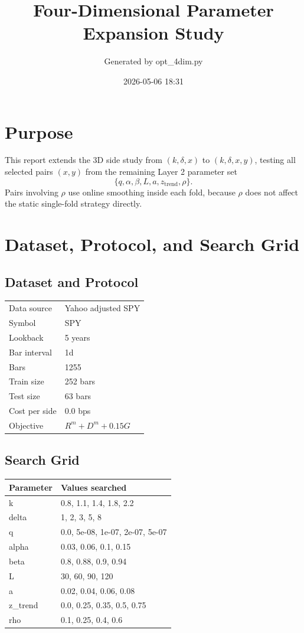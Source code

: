 \documentclass[10pt]{article}
\title{Four-Dimensional Parameter Expansion Study}
\author{Generated by opt\_4dim.py}
\date{2026-05-06 18:31}
\begin{document}
\maketitle

\section*{Purpose}
This report extends the 3D side study from $(k,\delta,x)$ to
$(k,\delta,x,y)$, testing all selected pairs $(x,y)$ from the remaining
Layer 2 parameter set
\[
\{q,\alpha,\beta,L,a,z_{\mathrm{trend}},\rho\}.
\]
Pairs involving $\rho$ use online smoothing inside each fold, because $\rho$
does not affect the static single-fold strategy directly.

\section*{Dataset, Protocol, and Search Grid}
\noindent
\begin{minipage}[t]{0.47\textwidth}
\subsection*{Dataset and Protocol}
\small
\begin{tabular}{ll}
\toprule
Data source & Yahoo adjusted SPY \\
Symbol & SPY \\
Lookback & 5 years \\
Bar interval & 1d \\
Bars & 1255 \\
Train size & 252 bars \\
Test size & 63 bars \\
Cost per side & 0.0 bps \\
Objective & $R^m + D^m + 0.15G$ \\
\bottomrule
\end{tabular}
\end{minipage}
\hfill
\begin{minipage}[t]{0.49\textwidth}
\subsection*{Search Grid}
\small
\begin{tabular}{ll}
\toprule
Parameter & Values searched \\
\midrule
k & 0.8, 1.1, 1.4, 1.8, 2.2 \\
delta & 1, 2, 3, 5, 8 \\
q & 0.0, 5e-08, 1e-07, 2e-07, 5e-07 \\
alpha & 0.03, 0.06, 0.1, 0.15 \\
beta & 0.8, 0.88, 0.9, 0.94 \\
L & 30, 60, 90, 120 \\
a & 0.02, 0.04, 0.06, 0.08 \\
z\_trend & 0.0, 0.25, 0.35, 0.5, 0.75 \\
rho & 0.1, 0.25, 0.4, 0.6 \\
\bottomrule
\end{tabular}
\end{minipage}
\normalsize
\end{document}
